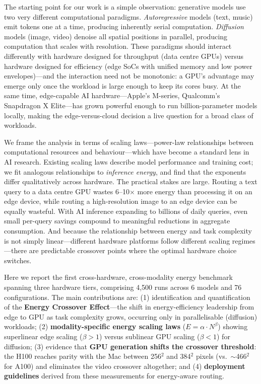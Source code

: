 \documentclass[11pt]{article}
\begin{document}
The starting point for our work is a simple observation: generative models use two very different computational paradigms. \textit{Autoregressive} models (text, music) emit tokens one at a time, producing inherently serial computation. \textit{Diffusion} models\cite{rombach2022high} (image, video) denoise all spatial positions in parallel, producing computation that scales with resolution. These paradigms should interact differently with hardware designed for throughput (data centre GPUs) versus hardware designed for efficiency (edge SoCs with unified memory and low power envelopes)\cite{mao2024green}---and the interaction need not be monotonic: a GPU's advantage may emerge only once the workload is large enough to keep its cores busy. At the same time, edge-capable AI hardware---Apple's M-series, Qualcomm's Snapdragon X Elite---has grown powerful enough to run billion-parameter models locally, making the edge-versus-cloud decision a live question for a broad class of workloads.

We frame the analysis in terms of scaling laws---power-law relationships between computational resources and behaviour---which have become a standard lens in AI research\cite{kaplan2020scaling}. Existing scaling laws describe model performance and training cost; we fit analogous relationships to \textit{inference energy}, and find that the exponents differ qualitatively across hardware. The practical stakes are large. Routing a text query to a data centre GPU wastes 6--10$\times$ more energy than processing it on an edge device, while routing a high-resolution image to an edge device can be equally wasteful. With AI inference expanding to billions of daily queries\cite{devries2023growing}, even small per-query savings compound to meaningful reductions in aggregate consumption. And because the relationship between energy and task complexity is not simply linear---different hardware platforms follow different scaling regimes---there are predictable crossover points where the optimal hardware choice switches.

Here we report the first cross-hardware, cross-modality energy benchmark spanning three hardware tiers, comprising 4,500 runs across 6 models and 76 configurations. The main contributions are: (1) identification and quantification of the \textbf{Energy Crossover Effect}---the shift in energy-efficiency leadership from edge to GPU as task complexity grows, occurring only in parallelisable (diffusion) workloads; (2) \textbf{modality-specific energy scaling laws} ($E = \alpha \cdot N^\beta$) showing superlinear edge scaling ($\beta > 1$) versus sublinear GPU scaling ($\beta < 1$) for diffusion; (3) evidence that \textbf{GPU generation shifts the crossover threshold}: the H100 reaches parity with the Mac between 256$^2$ and 384$^2$ pixels (vs.\ $\sim$466$^2$ for A100) and eliminates the video crossover altogether; and (4) \textbf{deployment guidelines} derived from these measurements for energy-aware routing.
\end{document}
